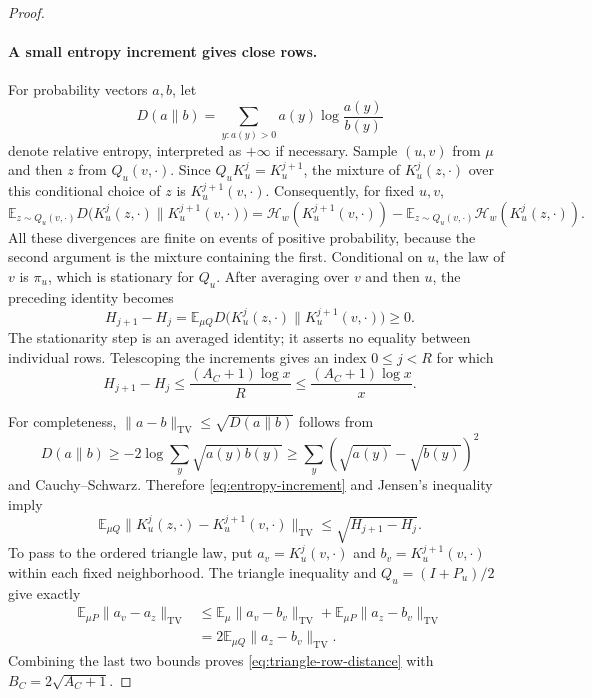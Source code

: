 \begin{proof}
\paragraph{A small entropy increment gives close rows.}
For probability vectors $a,b$, let
\[
 D(a\|b)=\sum_{y:a(y)>0}a(y)\log\frac{a(y)}{b(y)}
\]
denote relative entropy, interpreted as $+\infty$ if necessary.  Sample
$(u,v)$ from $\mu$ and then $z$ from $Q_u(v,\cdot)$.  Since
$Q_uK_u^j=K_u^{j+1}$, the mixture of $K_u^j(z,\cdot)$ over this conditional
choice of $z$ is $K_u^{j+1}(v,\cdot)$.  Consequently, for fixed $u,v$,
\[
 \mathbb E_{z\sim Q_u(v,\cdot)}
 D\bigl(K_u^j(z,\cdot)\|K_u^{j+1}(v,\cdot)\bigr)
 =\mathcal H_w(K_u^{j+1}(v,\cdot))
  -\mathbb E_{z\sim Q_u(v,\cdot)}\mathcal H_w(K_u^j(z,\cdot)).
\]
All these divergences are finite on events of positive probability,
because the second argument is the mixture containing the first.
Conditional on $u$, the law of $v$ is $\pi_u$, which is stationary for
$Q_u$.  After averaging over $v$ and then $u$, the preceding identity
becomes
\begin{equation}
 H_{j+1}-H_j
 =\mathbb E_{\mu Q}
 D\bigl(K_u^j(z,\cdot)\|K_u^{j+1}(v,\cdot)\bigr)\ge0.
 \label{eq:entropy-increment}
\end{equation}
The stationarity step is an averaged identity; it asserts no equality
between individual rows.  Telescoping the increments gives an index
$0\le j<R$ for which
\[
 H_{j+1}-H_j\le\frac{(A_C+1)\log x}{R}
 \le\frac{(A_C+1)\log x}{x}.
\]

For completeness, $\|a-b\|_{\mathrm{TV}}\le\sqrt{D(a\|b)}$ follows
from
\[
 D(a\|b)\ge-2\log\sum_y\sqrt{a(y)b(y)}
 \ge\sum_y(\sqrt{a(y)}-\sqrt{b(y)})^2
\]
and Cauchy--Schwarz.  Therefore \eqref{eq:entropy-increment} and Jensen's
inequality imply
\[
 \mathbb E_{\mu Q}
 \bigl\|K_u^j(z,\cdot)-K_u^{j+1}(v,\cdot)\bigr\|_{\mathrm{TV}}
 \le\sqrt{H_{j+1}-H_j}.
\]
To pass to the ordered triangle law, put
$a_v=K_u^j(v,\cdot)$ and $b_v=K_u^{j+1}(v,\cdot)$ within each fixed
neighborhood.  The triangle inequality and $Q_u=(I+P_u)/2$ give exactly
\begin{align*}
 \mathbb E_{\mu P}\|a_v-a_z\|_{\mathrm{TV}}
 &\le\mathbb E_\mu\|a_v-b_v\|_{\mathrm{TV}}
     +\mathbb E_{\mu P}\|a_z-b_v\|_{\mathrm{TV}}\\
 &=2\mathbb E_{\mu Q}\|a_z-b_v\|_{\mathrm{TV}}.
\end{align*}
Combining the last two bounds proves \eqref{eq:triangle-row-distance}
with $B_C=2\sqrt{A_C+1}$.
\end{proof}
